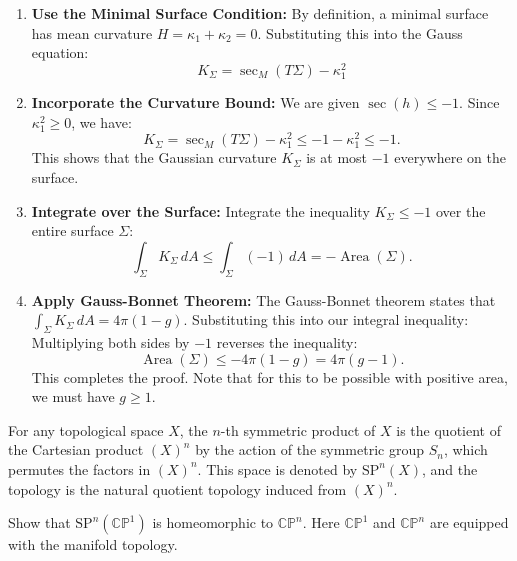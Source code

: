 \begin{solution}
\begin{enumerate}
    \item \textbf{Use the Minimal Surface Condition:}
    By definition, a minimal surface has mean curvature $H = \kappa_1 + \kappa_2 = 0$.
    Substituting this into the Gauss equation:
    \[ K_\Sigma = \sec_M(T\Sigma) - \kappa_1^2 \]
    
    \item \textbf{Incorporate the Curvature Bound:}
    We are given $\sec(h) \leq -1$. Since $\kappa_1^2 \geq 0$, we have:
    \[ K_\Sigma = \sec_M(T\Sigma) - \kappa_1^2 \leq -1 - \kappa_1^2 \leq -1. \]
    This shows that the Gaussian curvature $K_\Sigma$ is at most $-1$ everywhere on the surface.
    
    \item \textbf{Integrate over the Surface:}
    Integrate the inequality $K_\Sigma \leq -1$ over the entire surface $\Sigma$:
    \[ \int_\Sigma K_\Sigma \, dA \leq \int_\Sigma (-1) \, dA = -\operatorname{Area}(\Sigma). \]
    
    \item \textbf{Apply Gauss-Bonnet Theorem:}
    The Gauss-Bonnet theorem states that $\int_\Sigma K_\Sigma \, dA = 4\pi(1 - g)$.
    Substituting this into our integral inequality:
    Multiplying both sides by $-1$ reverses the inequality:
    \[ \operatorname{Area}(\Sigma) \leq -4\pi(1 - g) = 4\pi(g - 1). \]
    This completes the proof. Note that for this to be possible with positive area, we must have $g \geq 1$.
\end{enumerate}
\end{solution}

\begin{exercise}
\label{geometry:2022:3}
For any topological space $X$, the $n$-th symmetric product of $X$ is the quotient of the Cartesian product $(X)^n$ by the action of the symmetric group $S_n$, which permutes the factors in $(X)^n$. This space is denoted by $\mathrm{SP}^n(X)$, and the topology is the natural quotient topology induced from $(X)^n$.

Show that $\mathrm{SP}^n(\mathbb{CP}^1)$ is homeomorphic to $\mathbb{CP}^n$. Here $\mathbb{CP}^1$ and $\mathbb{CP}^n$ are equipped with the manifold topology.
\end{exercise}

